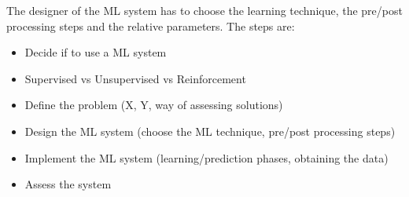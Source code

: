 The designer of the ML system has to choose the learning technique, the pre/post processing steps and the relative parameters. The steps are:
\begin{itemize}
    \item Decide if to use a ML system
    \item Supervised vs Unsupervised vs Reinforcement
    \item Define the problem (X, Y, way of assessing solutions)
    \item Design the ML system (choose the ML technique, pre/post processing steps)
    \item Implement the ML system (learning/prediction phases, obtaining the data)
    \item Assess the system
\end{itemize}

